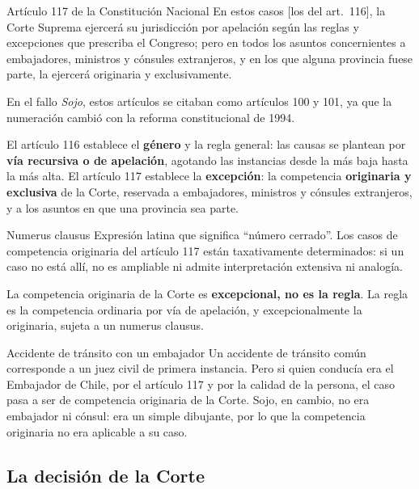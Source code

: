 \documentclass[12pt,oneside]{book}
\begin{document}
\begin{norma}{Artículo 117 de la Constitución Nacional}
En estos casos [los del art.\ 116], la Corte Suprema ejercerá su jurisdicción por apelación según las reglas y excepciones que prescriba el Congreso; pero en todos los asuntos concernientes a embajadores, ministros y cónsules extranjeros, y en los que alguna provincia fuese parte, la ejercerá originaria y exclusivamente.
\end{norma}

\begin{note}
En el fallo \emph{Sojo}, estos artículos se citaban como artículos 100 y 101, ya que la numeración cambió con la reforma constitucional de 1994.
\end{note}

El artículo 116 establece el \textbf{género} y la regla general: las causas se plantean por \textbf{vía recursiva o de apelación}, agotando las instancias desde la más baja hasta la más alta. El artículo 117 establece la \textbf{excepción}: la competencia \textbf{originaria y exclusiva} de la Corte, reservada a embajadores, ministros y cónsules extranjeros, y a los asuntos en que una provincia sea parte.

\begin{definition}{Numerus clausus}
Expresión latina que significa ``número cerrado''. Los casos de competencia originaria del artículo 117 están taxativamente determinados: si un caso no está allí, no es ampliable ni admite interpretación extensiva ni analogía.
\end{definition}

\begin{important}
La competencia originaria de la Corte es \textbf{excepcional, no es la regla}. La regla es la competencia ordinaria por vía de apelación, y excepcionalmente la originaria, sujeta a un numerus clausus.
\end{important}

\begin{example}{Accidente de tránsito con un embajador}
Un accidente de tránsito común corresponde a un juez civil de primera instancia. Pero si quien conducía era el Embajador de Chile, por el artículo 117 y por la calidad de la persona, el caso pasa a ser de competencia originaria de la Corte. Sojo, en cambio, no era embajador ni cónsul: era un simple dibujante, por lo que la competencia originaria no era aplicable a su caso.
\end{example}

\subsection{La decisión de la Corte}
\end{document}
